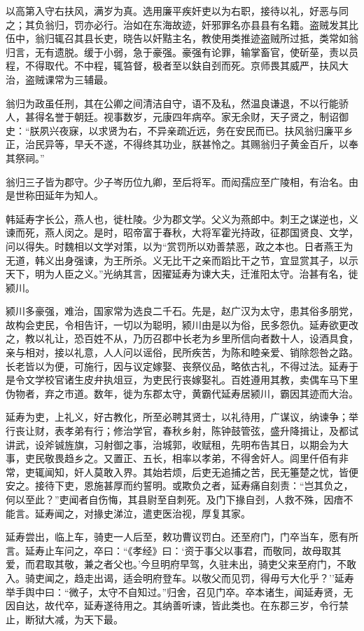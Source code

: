 \documentclass[]{article}
\begin{document}
以高第入守右扶风，满岁为真。选用廉平疾奸吏以为右职，接待以礼，好恶与同之；其负翁归，罚亦必行。治如在东海故迹，奸邪罪名亦县县有名籍。盗贼发其比伍中，翁归辄召其县长吏，晓告以奸黠主名，教使用类推迹盗贼所过抵，类常如翁归言，无有遗脱。缓于小弱，急于豪强。豪强有论罪，输掌畜官，使斫莝，责以员程，不得取代。不中程，辄笞督，极者至以鈇自刭而死。京师畏其威严，扶风大治，盗贼课常为三辅最。

翁归为政虽任刑，其在公卿之间清洁自守，语不及私，然温良谦退，不以行能骄人，甚得名誉于朝廷。视事数岁，元康四年病卒。家无余财，天子贤之，制诏御史：``朕夙兴夜寐，以求贤为右，不异亲疏近远，务在安民而已。扶风翁归廉平乡正，治民异等，早夭不遂，不得终其功业，朕甚怜之。其赐翁归子黄金百斤，以奉其祭祠。''

翁归三子皆为郡守。少子岑历位九卿，至后将军。而闳孺应至广陵相，有治名。由是世称田延年为知人。

韩延寿字长公，燕人也，徙杜陵。少为郡文学。父义为燕郎中。刺王之谋逆也，义谏而死，燕人闵之。是时，昭帝富于春秋，大将军霍光持政，征郡国贤良、文学，问以得失。时魏相以文学对策，以为``赏罚所以劝善禁恶，政之本也。日者燕王为无道，韩义出身强谏，为王所杀。义无比干之亲而蹈比干之节，宜显赏其子，以示天下，明为人臣之义。''光纳其言，因擢延寿为谏大夫，迁淮阳太守。治甚有名，徙颍川。

颍川多豪强，难治，国家常为选良二千石。先是，赵广汉为太守，患其俗多朋党，故构会吏民，令相告讦，一切以为聪明，颍川由是以为俗，民多怨仇。延寿欲更改之，教以礼让，恐百姓不从，乃历召郡中长老为乡里所信向者数十人，设酒具食，亲与相对，接以礼意，人人问以谣俗，民所疾苦，为陈和睦亲爱、销除怨咎之路。长老皆以为便，可施行，因与议定嫁娶、丧祭仪品，略依古礼，不得过法。延寿于是令文学校官诸生皮弁执俎豆，为吏民行丧嫁娶礼。百姓遵用其教，卖偶车马下里伪物者，弃之市道。数年，徙为东郡太守，黄霸代延寿居颍川，霸因其迹而大治。

延寿为吏，上礼义，好古教化，所至必聘其贤士，以礼待用，广谋议，纳谏争；举行丧让财，表孝弟有行；修治学官，春秋乡射，陈钟鼓管弦，盛升降揖让，及都试讲武，设斧铖旌旗，习射御之事，治城郭，收赋租，先明布告其日，以期会为大事，吏民敬畏趋乡之。又置正、五长，相率以孝弟，不得舍奸人。闾里仟佰有非常，吏辄闻知，奸人莫敢入界。其始若烦，后吏无追捕之苦，民无箠楚之忧，皆便安之。接待下吏，恩施甚厚而约誓明。或欺负之者，延寿痛自刻责：``岂其负之，何以至此？''吏闻者自伤悔，其县尉至自刺死。及门下掾自刭，人救不殊，因瘖不能言。延寿闻之，对掾史涕泣，遣吏医治视，厚复其家。

延寿尝出，临上车，骑吏一人后至，敕功曹议罚白。还至府门，门卒当车，愿有所言。延寿止车问之，卒曰：``《孝经》曰：`资于事父以事君，而敬同，故母取其爱，而君取其敬，兼之者父也。'今旦明府早驾，久驻未出，骑吏父来至府门，不敢入。骑吏闻之，趋走出谒，适会明府登车。以敬父而见罚，得毋亏大化乎？''延寿举手舆中曰：``微子，太守不自知过。''归舍，召见门卒。卒本诸生，闻延寿贤，无因自达，故代卒，延寿遂待用之。其纳善听谏，皆此类也。在东郡三岁，令行禁止，断狱大减，为天下最。
\end{document}
